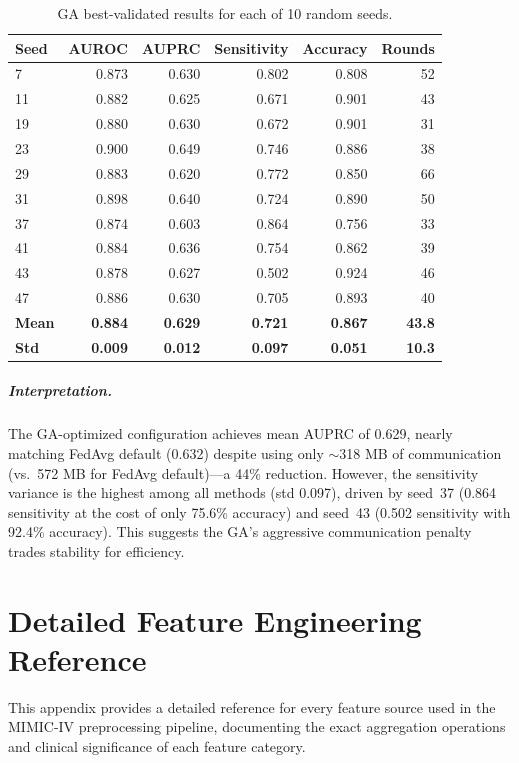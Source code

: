 \documentclass[11pt,a4paper]{report}
\begin{document}
\begin{longtable}{lrrrrr}
\caption{GA best-validated results for each of 10 random seeds.} \label{tab:ga_seeds} \\
\toprule
\textbf{Seed} & \textbf{AUROC} & \textbf{AUPRC} & \textbf{Sensitivity} & \textbf{Accuracy} & \textbf{Rounds} \\
\midrule
\endhead
7 & 0.873 & 0.630 & 0.802 & 0.808 & 52 \\
11 & 0.882 & 0.625 & 0.671 & 0.901 & 43 \\
19 & 0.880 & 0.630 & 0.672 & 0.901 & 31 \\
23 & 0.900 & 0.649 & 0.746 & 0.886 & 38 \\
29 & 0.883 & 0.620 & 0.772 & 0.850 & 66 \\
31 & 0.898 & 0.640 & 0.724 & 0.890 & 50 \\
37 & 0.874 & 0.603 & 0.864 & 0.756 & 33 \\
41 & 0.884 & 0.636 & 0.754 & 0.862 & 39 \\
43 & 0.878 & 0.627 & 0.502 & 0.924 & 46 \\
47 & 0.886 & 0.630 & 0.705 & 0.893 & 40 \\
\midrule
\textbf{Mean} & \textbf{0.884} & \textbf{0.629} & \textbf{0.721} & \textbf{0.867} & \textbf{43.8} \\
\textbf{Std} & \textbf{0.009} & \textbf{0.012} & \textbf{0.097} & \textbf{0.051} & \textbf{10.3} \\
\bottomrule
\end{longtable}

\paragraph{Interpretation.} The GA-optimized configuration achieves mean AUPRC of 0.629, nearly matching FedAvg default (0.632) despite using only $\sim$318 MB of communication (vs.\ 572 MB for FedAvg default)---a 44\% reduction. However, the sensitivity variance is the highest among all methods (std 0.097), driven by seed~37 (0.864 sensitivity at the cost of only 75.6\% accuracy) and seed~43 (0.502 sensitivity with 92.4\% accuracy). This suggests the GA's aggressive communication penalty trades stability for efficiency.


\chapter{Detailed Feature Engineering Reference}

This appendix provides a detailed reference for every feature source used in the MIMIC-IV preprocessing pipeline, documenting the exact aggregation operations and clinical significance of each feature category.
\end{document}

